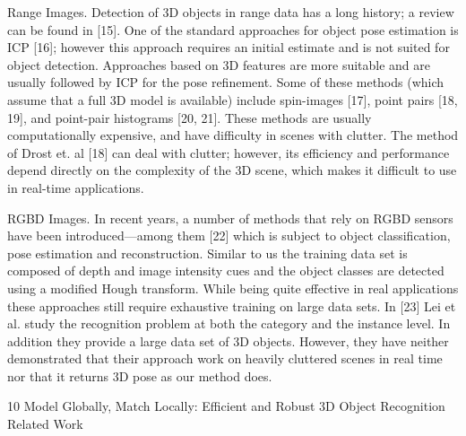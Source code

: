 \documentclass[10]{article}
\begin{document}
Range Images. Detection of 3D objects in range data has a long history; a review can be found in [15]. One of the standard approaches for object pose estimation is ICP [16]; however this approach requires an initial estimate and is not suited for object detection. Approaches based on 3D features are more suitable and are usually followed by ICP for the pose refinement. Some of these methods (which assume that a full 3D model is available) include spin-images [17], point pairs [18, 19], and point-pair histograms [20, 21]. These methods are usually computationally expensive, and have difficulty in scenes with clutter. The method of Drost et. al [18] can deal with clutter; however, its efficiency and performance depend directly on the complexity of the 3D scene, which makes it difficult to use in real-time applications. 

RGBD Images. In recent years, a number of methods that rely on RGBD sensors have been introduced—among them [22] which is subject to object classification, pose estimation and reconstruction. Similar to us the training data set is composed of depth and image intensity cues and the object classes are detected using a modified Hough transform. While being quite effective in real applications these approaches still require exhaustive training on large data sets.
In [23] Lei et al. study the recognition problem at both the category and the instance level. In addition they provide a large data set of 3D objects. However, they have neither demonstrated that their approach work on heavily cluttered scenes in real time nor that it returns 3D pose as our method does.


10 Model Globally, Match Locally: Efficient and Robust 3D Object Recognition\\

Related Work\\
\end{document}
